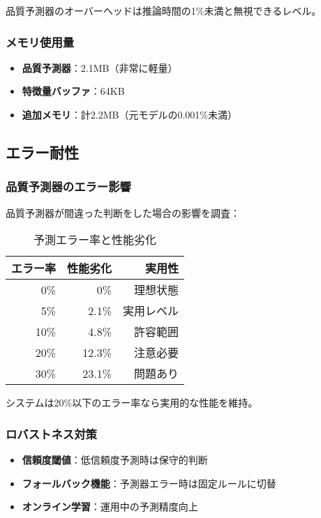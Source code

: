 \documentclass[a4paper,12pt]{jsarticle}
\begin{document}
品質予測器のオーバーヘッドは推論時間の1\%未満と無視できるレベル。

\subsubsection{メモリ使用量}

\begin{itemize}
\item \textbf{品質予測器}：2.1MB（非常に軽量）
\item \textbf{特徴量バッファ}：64KB
\item \textbf{追加メモリ}：計2.2MB（元モデルの0.001\%未満）
\end{itemize}

\subsection{エラー耐性}

\subsubsection{品質予測器のエラー影響}

品質予測器が間違った判断をした場合の影響を調査：

\begin{table}[H]
\centering
\caption{予測エラー率と性能劣化}
\begin{tabular}{|r|r|r|}
\hline
\textbf{エラー率} & \textbf{性能劣化} & \textbf{実用性} \\
\hline
0\% & 0\% & 理想状態 \\
5\% & 2.1\% & 実用レベル \\
10\% & 4.8\% & 許容範囲 \\
20\% & 12.3\% & 注意必要 \\
30\% & 23.1\% & 問題あり \\
\hline
\end{tabular}
\end{table}

システムは20\%以下のエラー率なら実用的な性能を維持。

\subsubsection{ロバストネス対策}

\begin{itemize}
\item \textbf{信頼度閾値}：低信頼度予測時は保守的判断
\item \textbf{フォールバック機能}：予測器エラー時は固定ルールに切替
\item \textbf{オンライン学習}：運用中の予測精度向上
\end{itemize}
\end{document}
